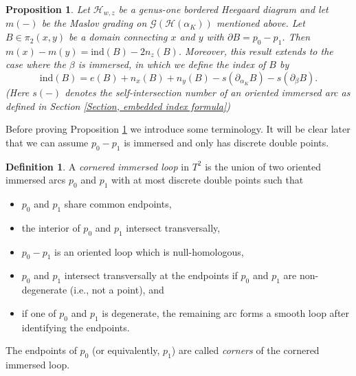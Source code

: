 \documentclass{amsart}
\newtheorem{prop}[thm]{Proposition}
\theoremstyle{definition}
\newtheorem{defn}[thm]{Definition}
\theoremstyle{remark}
\numberwithin{equation}{section}
\numberwithin{equation}{section} \makeatletter
\begin{document}
\begin{prop}\label{Proposition, identify two ways to compute the Maslov index for genus one diagram}
	Let $\mathcal{H}_{w,z}$ be a genus-one bordered Heegaard diagram and let $m(-)$ be the Maslov grading on $\mathcal{G}(\mathcal{H}(\alpha_{K}))$ mentioned above. Let $B\in \pi_2(x,y)$ be a domain connecting $x$ and $y$ with $\partial B= p_0-p_1$. Then $m(x)-m(y)=\text{ind}(B)-2n_z(B)$. Moreover, this result extends to the case where the $\beta$ is immersed, in which we define the index of $B$ by $$\text{ind}(B)=e(B)+n_{x}(B)+n_{y}(B)-s(\partial _{\alpha_K} B)-s(\partial_{\beta}B).$$ 
	(Here $s(-)$ denotes the self-intersection number of an oriented immersed arc as defined in Section \ref{Section, embedded index formula})
\end{prop}
Before proving Proposition \ref{Proposition, identify two ways to compute the Maslov index for genus one diagram} we introduce some terminology. It will be clear later that we can assume $p_0-p_1$ is immersed and only has discrete double points. 

\begin{defn}
A \textit{cornered immersed loop} in $T^2$ is the union of two oriented immersed arcs $p_0$ and $p_1$ with at most discrete double points such that 
\begin{itemize}
\item[(1)] $p_0$ and $p_1$ share common endpoints,
\item[(2)] the interior of $p_0$ and $p_1$ intersect transversally, 
\item[(3)] $p_0-p_1$ is an oriented loop which is null-homologous,
\item[(4)] $p_0$ and $p_1$ intersect transversally at the endpoints if $p_0$ and $p_1$ are non-degenerate (i.e., not a point), and
\item[(5)] if one of $p_0$ and $p_1$ is degenerate, the remaining arc forms a smooth loop after identifying the endpoints. 
\end{itemize}
The endpoints of $p_0$ (or equivalently, $p_1$) are called \textit{corners} of the cornered immersed loop.
\end{defn}
\end{document}
